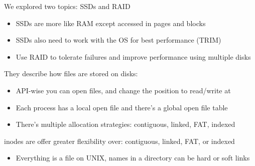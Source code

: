   \begin{slide}
  
  
    We explored two topics: SSDs and RAID
  
    \begin{itemize}
      \item SSDs are more like RAM except accessed in pages and blocks
      \item SSDs also need to work with the OS for best performance (TRIM)
      \item Use RAID to tolerate failures and improve performance using multiple disks
    \end{itemize}
  
  \end{slide}

  \begin{slide}
    

    They describe how files are stored on disks:
    \begin{itemize}
      \item API-wise you can open files, and change the position to read/write
            at
      \item Each process has a local open file and there's a global open file
            table
      \item There's multiple allocation strategies: contiguous, linked, FAT, indexed
    \end{itemize}

  \end{slide}

  \begin{slide}
    
    
    inodes are offer greater flexibility over: contiguous, linked, FAT, or
    indexed

    \begin{itemize}
      \item Everything is a file on UNIX, names in a directory can be hard or
            soft links
    \end{itemize}

  \end{slide}

